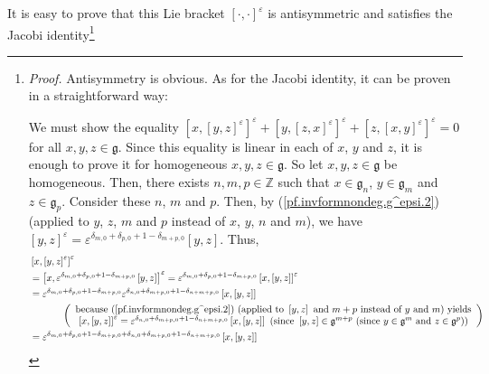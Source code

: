 \documentclass
[numbers=enddot,12pt,final,onecolumn,german,notitlepage]{scrartcl}%
\theoremstyle{definition}
\begin{document}
It is easy to prove that this Lie bracket $\left[  \cdot,\cdot\right]
^{\varepsilon}$ is antisymmetric and satisfies the Jacobi
identity\footnote{\textit{Proof.} Antisymmetry is obvious. As for the Jacobi
identity, it can be proven in a straightforward way:
\par
We must show the equality $\left[  x,\left[  y,z\right]  ^{\varepsilon
}\right]  ^{\varepsilon}+\left[  y,\left[  z,x\right]  ^{\varepsilon}\right]
^{\varepsilon}+\left[  z,\left[  x,y\right]  ^{\varepsilon}\right]
^{\varepsilon}=0$ for all $x,y,z\in\mathfrak{g}$. Since this equality is
linear in each of $x$, $y$ and $z$, it is enough to prove it for homogeneous
$x,y,z\in\mathfrak{g}$. So let $x,y,z\in\mathfrak{g}$ be homogeneous. Then,
there exists $n,m,p\in\mathbb{Z}$ such that $x\in\mathfrak{g}_{n}$,
$y\in\mathfrak{g}_{m}$ and $z\in\mathfrak{g}_{p}$. Consider these $n$, $m$ and
$p$. Then, by (\ref{pf.invformnondeg.g^epsi.2}) (applied to $y$, $z$, $m$ and
$p$ instead of $x$, $y$, $n$ and $m$), we have $\left[  y,z\right]
^{\varepsilon}=\varepsilon^{\delta_{m,0}+\delta_{p,0}+1-\delta_{m+p,0}}\left[
y,z\right]  $. Thus,%
\begin{align*}
&  \left[  x,\left[  y,z\right]  ^{\varepsilon}\right]  ^{\varepsilon}\\
&  =\left[  x,\varepsilon^{\delta_{m,0}+\delta_{p,0}+1-\delta_{m+p,0}}\left[
y,z\right]  \right]  ^{\varepsilon}=\varepsilon^{\delta_{m,0}+\delta
_{p,0}+1-\delta_{m+p,0}}\left[  x,\left[  y,z\right]  \right]  ^{\varepsilon
}\\
&  =\varepsilon^{\delta_{m,0}+\delta_{p,0}+1-\delta_{m+p,0}}\varepsilon
^{\delta_{n,0}+\delta_{m+p,0}+1-\delta_{n+m+p,0}}\left[  x,\left[  y,z\right]
\right] \\
&  \ \ \ \ \ \ \ \ \ \ \left(
\begin{array}
[c]{c}%
\text{because (\ref{pf.invformnondeg.g^epsi.2}) (applied to }\left[
y,z\right]  \text{ and }m+p\text{ instead of }y\text{ and }m\text{) yields}\\
\left[  x,\left[  y,z\right]  \right]  ^{\varepsilon}=\varepsilon
^{\delta_{n,0}+\delta_{m+p,0}+1-\delta_{n+m+p,0}}\left[  x,\left[  y,z\right]
\right]  \text{ (since }\left[  y,z\right]  \in\mathfrak{g}^{m+p}\text{ (since
}y\in\mathfrak{g}^{m}\text{ and }z\in\mathfrak{g}^{p}\text{))}%
\end{array}
\right) \\
&  =\varepsilon^{\delta_{m,0}+\delta_{p,0}+1-\delta_{m+p,0}+\delta
_{n,0}+\delta_{m+p,0}+1-\delta_{n+m+p,0}}\left[  x,\left[  y,z\right]  \right]
\\

\end{align*}}
\end{document}
